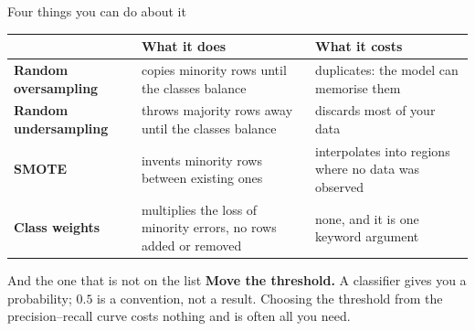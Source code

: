 \documentclass[aspectratio=169]{beamer}
\begin{document}
\begin{frame}[shrink=6]{Four things you can do about it}
  \begin{center}\small
  \begin{tabular}{@{}lp{4.5cm}p{4.3cm}@{}}
    \toprule
    & \textbf{What it does} & \textbf{What it costs}\\
    \midrule
    \textbf{Random oversampling} & copies minority rows until the classes
      balance & duplicates: the model can memorise them\\[4pt]
    \textbf{Random undersampling} & throws majority rows away until the
      classes balance & discards most of your data\\[4pt]
    \textbf{SMOTE} & invents minority rows between existing ones &
      interpolates into regions where no data was observed\\[4pt]
    \textbf{Class weights} & multiplies the loss of minority errors, no rows
      added or removed & none, and it is one keyword argument\\
    \bottomrule
  \end{tabular}
  \end{center}
  \begin{alertblock}{And the one that is not on the list}
    \small \textbf{Move the threshold.} A classifier gives you a probability;
    $0.5$ is a convention, not a result. Choosing the threshold from the
    precision--recall curve costs nothing and is often all you need.
  \end{alertblock}
\end{frame}
\end{document}
